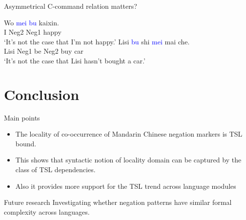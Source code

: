 \documentclass[professionalfonts, xcolor={usenames,svgnames,x11names,table}]{beamer}
\begin{document}
\begin{frame}{Asymmetrical C-command relation matters?}
 \begin{exe}
             \gll Wo  \textcolor{blue}{mei}  \textcolor{blue}{bu}  kaixin. \\
                     I  Neg2  Neg1  happy \\
                \glt `It's not the case that I'm not happy.'
 \pause               
   \ex \gll Lisi  \textcolor{blue}{bu}  shi  \textcolor{blue}{mei}  mai  che. \\
                 Lisi  Neg1  be  Neg2  buy  car \\
                \glt `It's not the case that Lisi hasn't bought a car.'
\end{exe}

 \pause
\end{frame}


\section[Conclusion]{Conclusion}
\begin{frame}{Main points}
\begin{itemize}
\item The locality of co-occurrence of Mandarin Chinese negation markers is TSL bound. 
\pause
\item This shows that syntactic notion of locality domain can be captured by the class of TSL dependencies.
\item Also it provides more support  for the TSL trend across language modules
\end{itemize}  
\pause 
\begin{block}{Future research}
Investigating whether negation patterns have similar formal complexity across languages.
\end{block}
\end{frame}
\end{document}
